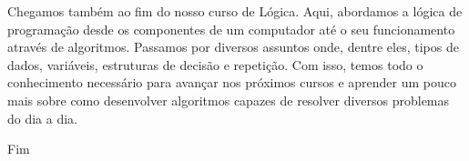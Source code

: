 \documentclass[11pt]{article}
\begin{document}
Chegamos também ao fim do nosso curso de Lógica. Aqui, abordamos a lógica de programação desde os componentes de um computador até o seu funcionamento através de algoritmos. Passamos por diversos assuntos onde, dentre eles, tipos de dados, variáveis, estruturas de decisão e repetição. Com isso, temos todo o conhecimento necessário para avançar nos próximos cursos e aprender um pouco mais sobre como desenvolver algoritmos capazes de resolver diversos problemas do dia a dia.

Fim
\end{document}
